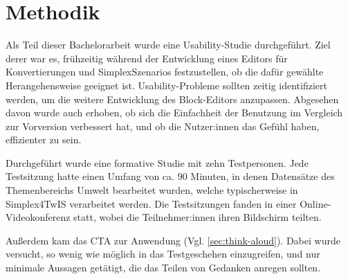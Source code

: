 \section{Methodik}

Als Teil dieser Bachelorarbeit wurde eine Usability-Studie durchgeführt. Ziel derer war es, frühzeitig während der Entwicklung eines Editors für Konvertierungen und SimplexSzenarios festzustellen, ob die dafür gewählte Herangehensweise geeignet ist. Usability-Probleme sollten zeitig identifiziert werden, um die weitere Entwicklung des Block-Editors anzupassen. Abgesehen davon wurde auch erhoben, ob sich die Einfachheit der Benutzung im Vergleich zur Vorversion verbessert hat, und ob die Nutzer:innen das Gefühl haben, effizienter zu sein.

Durchgeführt wurde eine formative Studie mit zehn Testpersonen. Jede Testsitzung hatte einen Umfang von ca. 90 Minuten, in denen Datensätze des Themenbereichs Umwelt bearbeitet wurden, welche typischerweise in Simplex4TwIS verarbeitet werden. Die Testsitzungen fanden in einer Online-Videokonferenz statt, wobei die Teilnehmer:innen ihren Bildschirm teilten.

Außerdem kam das \acf{CTA} zur Anwendung (Vgl. \ref{sec:think-aloud}). Dabei wurde versucht, so wenig wie möglich in das Testgeschehen einzugreifen, und nur minimale Aussagen getätigt, die das Teilen von Gedanken anregen sollten.

